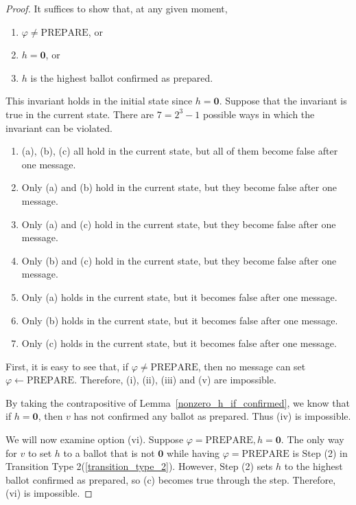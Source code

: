 \begin{proof}
    It suffices to show that, at any given moment,
    \begin{enumerate}[label=(\alph*)]
        \item %
            $\varphi \ne \text{PREPARE}$, or
        \item %
            $h = \textbf{0}$, or
        \item %
            $h$ is the highest ballot confirmed as prepared.
    \end{enumerate}
    This invariant holds in the initial state since $h = \textbf{0}$.
    Suppose that the invariant is true in the current state.
    There are $7 = 2^3 - 1$ possible ways in which the invariant can be violated.
    \begin{enumerate}[label=(\roman*)]
        \item %
            (a), (b), (c) all hold in the current state, but all of them become false after one message.
        \item %
            Only (a) and (b) hold in the current state, but they become false after one message.
        \item %
            Only (a) and (c) hold in the current state, but they become false after one message.
        \item %
            Only (b) and (c) hold in the current state, but they become false after one message.
        \item %
            Only (a) holds in the current state, but it becomes false after one message.
        \item %
            Only (b) holds in the current state, but it becomes false after one message.
        \item %
            Only (c) holds in the current state, but it becomes false after one message.
    \end{enumerate}

    First, it is easy to see that, if $\varphi \ne \text{PREPARE}$, then no message can set $\varphi \leftarrow \text{PREPARE}$.
    Therefore, (i), (ii), (iii) and (v) are impossible.

    By taking the contrapositive of Lemma~\ref{nonzero_h_if_confirmed}, we know that if $h = \textbf{0}$, then $v$ has not confirmed any ballot as prepared.
    Thus (iv) is impossible.

    We will now examine option (vi).
    Suppose $\varphi = \text{PREPARE}, h = \textbf{0}$.
    The only way for $v$ to set $h$ to a ballot that is not $\textbf{0}$ while having $\varphi = \text{PREPARE}$ is Step (2) in Transition Type 2(\ref{transition_type_2}).
    However, Step (2) sets $h$ to the highest ballot confirmed as prepared, so (c) becomes true through the step.
    Therefore, (vi) is impossible.


\end{proof}
